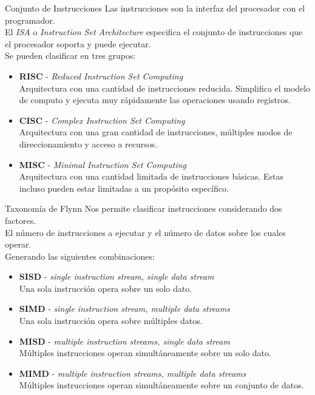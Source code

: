 \documentclass[aspectratio=169]{beamer}
\begin{document}
\begin{frame}[fragile,t]{Conjunto de Instrucciones}
    Las instrucciones son la interfaz del procesador con el programador.\\
    El \emph{ISA} o \emph{Instruction Set Architecture} especifica el conjunto de instrucciones que el procesador soporta y puede ejecutar.\\
    \bigskip
    Se pueden clasificar en tres grupos:
    \begin{itemize}
    \item \textbf{RISC} - \textcolor{naranjauca}{\emph{Reduced Instruction Set Computing}}\\
    Arquitectura con una cantidad de instrucciones reducida. Simplifica el modelo de computo y ejecuta muy rápidamente las operaciones usando registros.
    \item \textbf{CISC} - \textcolor{naranjauca}{\emph{Complex Instruction Set Computing}}\\
    Arquitectura con una gran cantidad de instrucciones, múltiples modos de direccionamiento y acceso a recursos.
    \item \textbf{MISC} - \textcolor{naranjauca}{\emph{Minimal Instruction Set Computing}}\\
    Arquitectura con una cantidad limitada de instrucciones básicas. Estas incluso pueden estar limitadas a un propósito específico.
    \end{itemize}
\end{frame}

\begin{frame}[fragile,t]{Taxonomía de Flynn}
    Nos permite clasificar instrucciones considerando dos factores.\\
    El número de instrucciones a ejecutar y el número de datos sobre los cuales operar.\\
    \bigskip
    Generando las siguientes combinaciones:
    \begin{itemize}
    \setlength\itemsep{0.2cm}
    \item \textbf{SISD} - \textcolor{naranjauca}{\emph{single instruction stream, single data stream}}\\
    Una sola instrucción opera sobre un solo dato.
    \item \textbf{SIMD} - \textcolor{naranjauca}{\emph{single instruction stream, multiple data streams}}\\
    Una sola instrucción opera sobre múltiples datos.
    \item \textbf{MISD} - \textcolor{naranjauca}{\emph{multiple instruction streams, single data stream}}\\
    Múltiples instrucciones operan simultáneamente sobre un solo dato.
    \item \textbf{MIMD} - \textcolor{naranjauca}{\emph{multiple instruction streams, multiple data streams}}\\
    Múltiples instrucciones operan simultáneamente sobre un conjunto de datos.
    \end{itemize}
\end{frame}
\end{document}

